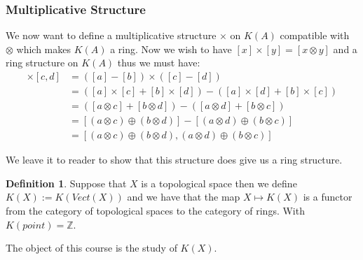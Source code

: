 \documentclass[a4paper,10pt]{article}
\theoremstyle{plain}%
\theoremstyle{definition}
\newtheorem{defn}{Definition}
\theoremstyle{remark}
\newcommand{\ZZ}{\mathbb{Z}}
\begin{document}
\subsubsection{Multiplicative Structure}

We now want to define a multiplicative structure $\times$ on $K(A)$ compatible with $\otimes$ which makes $K(A)$
a ring. Now we wish to have $[x]\times[y]=[x\otimes y]$ and a ring structure on $K(A)$ thus we must have:
\begin{align*}
 [a,b]\times[c,d] &= ([a]-[b])\times([c]-[d])\\
		  &= ([a]\times[c]+[b]\times[d])-([a]\times[d]+[b]\times[c])\\
		  &= ([a\otimes c]+[b\otimes d])-([a\otimes d]+[b\otimes c])\\
		  &= [(a\otimes c)\oplus(b\otimes d)]-[(a\otimes d)\oplus(b\otimes c)]\\
		  &= [(a\otimes c)\oplus(b\otimes d),(a\otimes d)\oplus(b\otimes c)]
\end{align*}

We leave it to reader to show that this structure does give us a ring structure.

\begin{defn}
 Suppose that $X$ is a topological space then we define $K(X):=K(Vect(X))$ and we have that the map $X\mapsto K(X)$
is a functor from the category of topological spaces to the category of rings. With $K(point)=\ZZ$.
\end{defn}

The object of this course is the study of $K(X)$.
\end{document}
